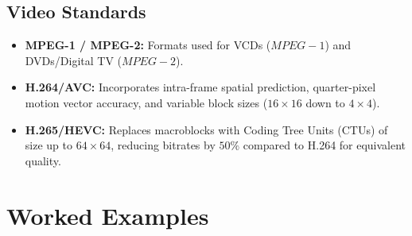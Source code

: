 \documentclass[12pt,a4paper]{article}
\begin{document}
\subsection{Video Standards}
\begin{itemize}[leftmargin=*, itemsep=3.5pt]
  \item \textbf{MPEG-1 / MPEG-2:} Formats used for VCDs ($MPEG-1$) and DVDs/Digital TV ($MPEG-2$).
  \item \textbf{H.264/AVC:} Incorporates intra-frame spatial prediction, quarter-pixel motion vector accuracy, and variable block sizes ($16\times16$ down to $4\times4$).
  \item \textbf{H.265/HEVC:} Replaces macroblocks with Coding Tree Units (CTUs) of size up to $64\times64$, reducing bitrates by $50\%$ compared to H.264 for equivalent quality.
\end{itemize}

\section{Worked Examples}
\end{document}
